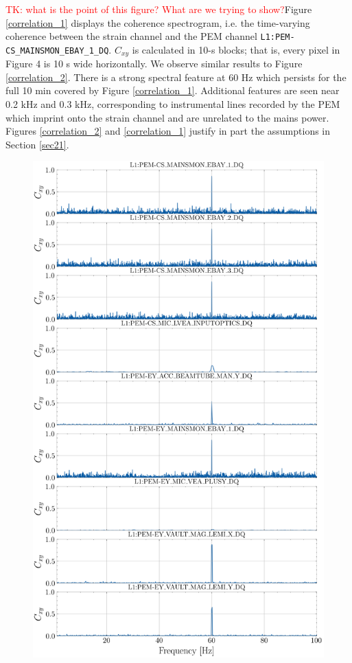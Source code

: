 \documentclass[pra,superscriptaddress,reprint,amsmath,amssymb,nofootinbib]{revtex4-2}
\newcommand{\PEMChanName}{\texttt{L1:PEM-CS\_MAINSMON\_EBAY\_1\_DQ}}
\begin{document}
 
\textcolor{red}{TK: what is the point of this figure? What are we trying to show?}Figure \ref{correlation_1} displays the coherence spectrogram, i.e. the time-varying coherence between the strain channel and the PEM channel \PEMChanName.  $C_{xy}$ is calculated in 10-s blocks; that is, every pixel in Figure 4 is 10 s wide horizontally. We observe similar results to Figure \ref{correlation_2}. There is a strong spectral feature at 60 Hz which persists for the full 10 min covered by Figure \ref{correlation_1}. Additional features are seen near 0.2 kHz and 0.3 kHz, corresponding to instrumental lines recorded by the PEM which imprint onto the strain channel and are unrelated to the mains power. Figures  \ref{correlation_2} and  \ref{correlation_1} justify in part the assumptions in Section \ref{sec21}.
\begin{figure}
	\begin{center}
		\includegraphics[width=\columnwidth]{images/stacked_coherence_plot}

\end{center}
\end{figure}
\end{document}

